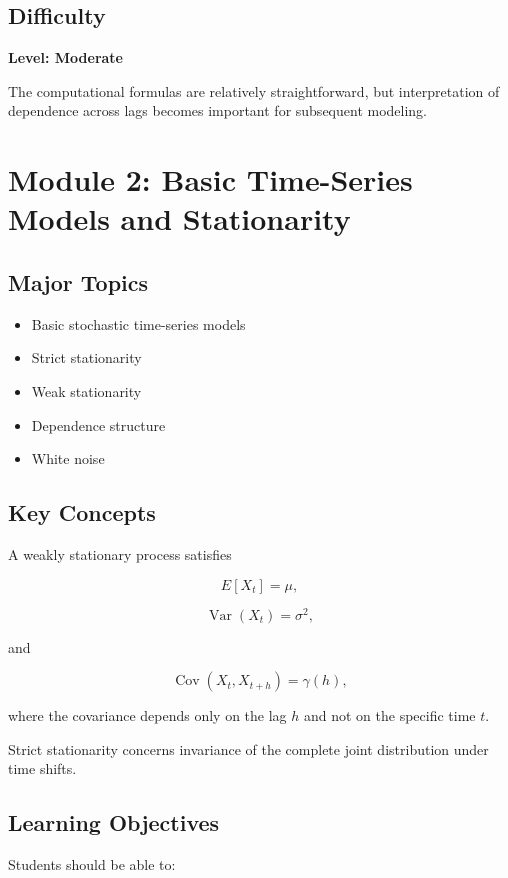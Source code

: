 \documentclass[11pt]{article}
\begin{document}
\subsection{Difficulty}

\textbf{Level: Moderate}

The computational formulas are relatively straightforward, but interpretation
of dependence across lags becomes important for subsequent modeling.

\section{Module 2: Basic Time-Series Models and Stationarity}

\subsection{Major Topics}

\begin{itemize}
    \item Basic stochastic time-series models
    \item Strict stationarity
    \item Weak stationarity
    \item Dependence structure
    \item White noise
\end{itemize}

\subsection{Key Concepts}

A weakly stationary process satisfies

\[
E[X_t] = \mu,
\]

\[
\operatorname{Var}(X_t) = \sigma^2,
\]

and

\[
\operatorname{Cov}(X_t,X_{t+h}) = \gamma(h),
\]

where the covariance depends only on the lag $h$ and not on the
specific time $t$.

Strict stationarity concerns invariance of the complete joint
distribution under time shifts.

\subsection{Learning Objectives}

Students should be able to:
\end{document}
